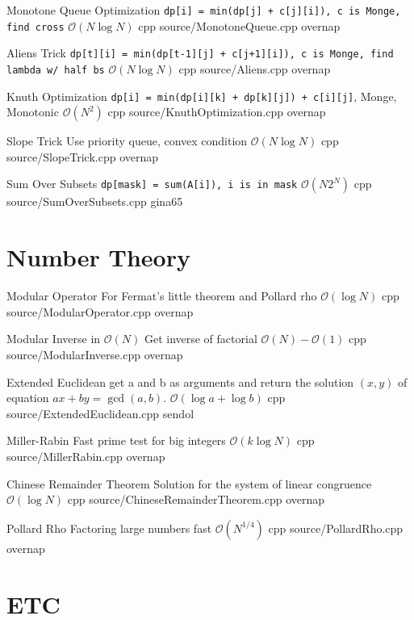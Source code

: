 \documentclass[landscape, 10pt, a4paper, oneside, twocolumn]{extarticle}
\begin{document}
\Algorithm
{Monotone Queue Optimization}
{\texttt{dp[i] = min(dp[j] + c[j][i]), c is Monge, find cross}}
{$\mathcal{O}(N\log{N})$}
{cpp}
{source/MonotoneQueue.cpp}
{overnap}

\Algorithm
{Aliens Trick}
{\texttt{dp[t][i] = min(dp[t-1][j] + c[j+1][i]), c is Monge, find lambda w/ half bs}}
{$\mathcal{O}(N\log{N})$}
{cpp}
{source/Aliens.cpp}
{overnap}

\Algorithm
{Knuth Optimization}
{\texttt{dp[i] = min(dp[i][k] + dp[k][j]) + c[i][j]}, Monge, Monotonic}
{$\mathcal{O}(N^2)$}
{cpp}
{source/KnuthOptimization.cpp}
{overnap}

\Algorithm
{Slope Trick}
{Use priority queue, convex condition}
{$\mathcal{O}(N\log{N})$}
{cpp}
{source/SlopeTrick.cpp}
{overnap}

\Algorithm
{Sum Over Subsets}
{\texttt{dp[mask] = sum(A[i]), i is in mask}}
{$\mathcal{O}(N2^N)$}
{cpp}
{source/SumOverSubsets.cpp}
{gina65}

\section{Number Theory}

\Algorithm
{Modular Operator}
{For Fermat's little theorem and Pollard rho}
{$\mathcal{O}(\log{N})$}
{cpp}
{source/ModularOperator.cpp}
{overnap}

\Algorithm
{Modular Inverse in $\mathcal{O}(N)$}
{Get inverse of factorial}
{$\mathcal{O}(N)-\mathcal{O}(1)$}
{cpp}
{source/ModularInverse.cpp}
{overnap}

\Algorithm
{Extended Euclidean}
{get a and b as arguments and return the solution $(x, y)$ of equation $ax + by = \gcd(a, b)$.}
{$\mathcal{O}(\log{a} + \log{b})$}
{cpp}
{source/ExtendedEuclidean.cpp}
{sendol}

\Algorithm
{Miller-Rabin}
{Fast prime test for big integers}
{$\mathcal{O}(k\log{N})$}
{cpp}
{source/MillerRabin.cpp}
{overnap}

\Algorithm
{Chinese Remainder Theorem}
{Solution for the system of linear congruence}
{$\mathcal{O}(\log{N})$}
{cpp}
{source/ChineseRemainderTheorem.cpp}
{overnap}

\Algorithm
{Pollard Rho}
{Factoring large numbers fast}
{$\mathcal{O}(N^{1/4})$}
{cpp}
{source/PollardRho.cpp}
{overnap}


\section{ETC}
\end{document}
